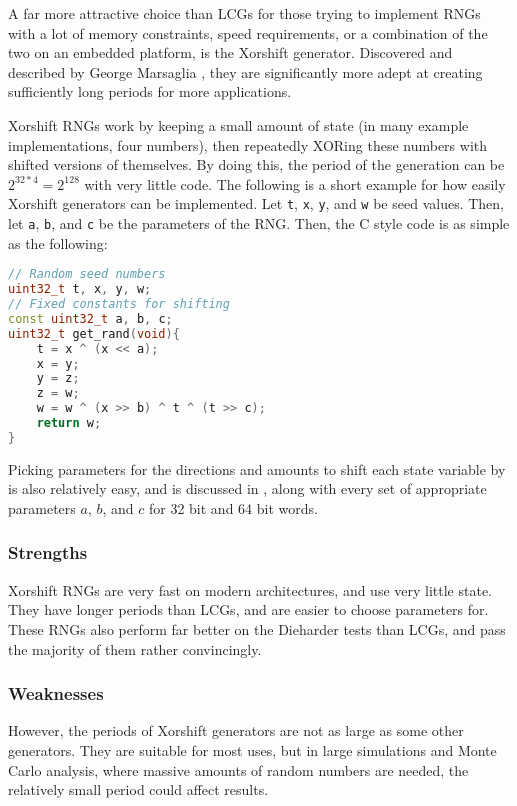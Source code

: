 A far more attractive choice than LCGs for those trying to implement RNGs with a lot of memory constraints, speed requirements, or a combination of the two on an embedded platform, is the Xorshift generator. Discovered and described by George Marsaglia \cite{marsaglia2003xorshift}, they are significantly more adept at creating sufficiently long periods for more applications.

Xorshift RNGs work by keeping a small amount of state (in many example implementations, four numbers), then repeatedly XORing these numbers with shifted versions of themselves. By doing this, the period of the generation can be $2^{32 * 4} = 2^{128}$ with very little code. The following is a short example for how easily Xorshift generators can be implemented. Let \texttt{t}, \texttt{x}, \texttt{y}, and \texttt{w} be seed values. Then, let \texttt{a}, \texttt{b}, and \texttt{c} be the parameters of the RNG. Then, the C style code is as simple as the following:

\begin{lstlisting}[frame=single,language=C++,basicstyle=\ttfamily]
// Random seed numbers
uint32_t t, x, y, w;
// Fixed constants for shifting
const uint32_t a, b, c;
uint32_t get_rand(void){
    t = x ^ (x << a);
    x = y;
    y = z;
    z = w;
    w = w ^ (x >> b) ^ t ^ (t >> c);
    return w;
}
\end{lstlisting}

Picking parameters for the directions and amounts to shift each state variable by is also relatively easy, and is discussed in \cite{marsaglia2003xorshift}, along with every set of appropriate parameters $a$, $b$, and $c$ for 32 bit and 64 bit words.

\subsubsection{Strengths}

Xorshift RNGs are very fast on modern architectures, and use very little state. They have longer periods than LCGs, and are easier to choose parameters for. These RNGs also perform far better on the Dieharder tests than LCGs, and pass the majority of them rather convincingly.

\subsubsection{Weaknesses}

However, the periods of Xorshift generators are not as large as some other generators. They are suitable for most uses, but in large simulations and Monte Carlo analysis, where massive amounts of random numbers are needed, the relatively small period could affect results.
